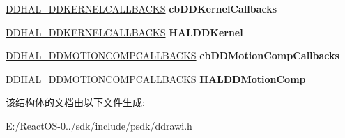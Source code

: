 \begin{DoxyCompactItemize}
\mbox{\label{struct___d_d_h_a_l___c_a_l_l_b_a_c_k_s_a54f801731274f5bdf8aa9a6999e4fc70}} 
\hyperlink{struct___d_d_h_a_l___d_d_k_e_r_n_e_l_c_a_l_l_b_a_c_k_s}{D\+D\+H\+A\+L\+\_\+\+D\+D\+K\+E\+R\+N\+E\+L\+C\+A\+L\+L\+B\+A\+C\+KS} {\bfseries cb\+D\+D\+Kernel\+Callbacks}
\item 
\mbox{\label{struct___d_d_h_a_l___c_a_l_l_b_a_c_k_s_a1a9b1b353b5c8369042a0cc3e844bcfe}} 
\hyperlink{struct___d_d_h_a_l___d_d_k_e_r_n_e_l_c_a_l_l_b_a_c_k_s}{D\+D\+H\+A\+L\+\_\+\+D\+D\+K\+E\+R\+N\+E\+L\+C\+A\+L\+L\+B\+A\+C\+KS} {\bfseries H\+A\+L\+D\+D\+Kernel}
\item 
\mbox{\label{struct___d_d_h_a_l___c_a_l_l_b_a_c_k_s_a36787a7efc815546d0513a743f60c36d}} 
\hyperlink{struct___d_d_h_a_l___d_d_m_o_t_i_o_n_c_o_m_p_c_a_l_l_b_a_c_k_s}{D\+D\+H\+A\+L\+\_\+\+D\+D\+M\+O\+T\+I\+O\+N\+C\+O\+M\+P\+C\+A\+L\+L\+B\+A\+C\+KS} {\bfseries cb\+D\+D\+Motion\+Comp\+Callbacks}
\item 
\mbox{\label{struct___d_d_h_a_l___c_a_l_l_b_a_c_k_s_afa961b67ad174b43f0fefb3479e0f1bd}} 
\hyperlink{struct___d_d_h_a_l___d_d_m_o_t_i_o_n_c_o_m_p_c_a_l_l_b_a_c_k_s}{D\+D\+H\+A\+L\+\_\+\+D\+D\+M\+O\+T\+I\+O\+N\+C\+O\+M\+P\+C\+A\+L\+L\+B\+A\+C\+KS} {\bfseries H\+A\+L\+D\+D\+Motion\+Comp}
\end{DoxyCompactItemize}


该结构体的文档由以下文件生成\+:\begin{DoxyCompactItemize}
\item 
E\+:/\+React\+O\+S-\/0../sdk/include/psdk/ddrawi.\+h\end{DoxyCompactItemize}
